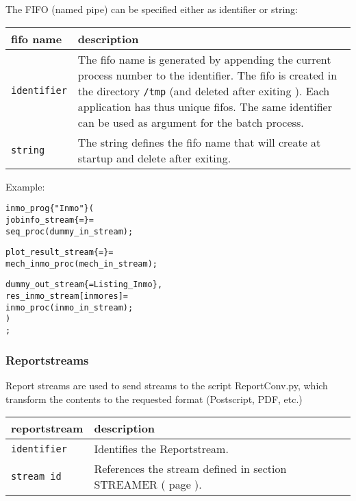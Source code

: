 The FIFO (named pipe) can be specified either as identifier or string:\\[2ex]
\begin{tabularx}{\textwidth}{l|X}
fifo name         & description \\
\hline
\verb+identifier+ & The fifo name is generated by appending the current process number
                    to the identifier. The fifo is created in the directory \verb+/tmp+
                    (and deleted after exiting \INTENS{}). Each \INTENS{} application has thus
                    unique fifos. The same identifier can be used as argument for the batch process.\\
\verb+string+     & The string defines the fifo name that \INTENS{} will create at startup
                    and delete after exiting.\\
\end{tabularx}
\vspace{0.5cm}

Example:

\begin{boxedminipage}[t]{\linewidth}
\begin{alltt}
  \PROCESSGROUP
     inmo_prog \{"Inmo"\} (
        jobinfo_stream \{\DISPLAY=\NONE\} =
           seq_proc( dummy_in_stream );

        plot_result_stream \{\DISPLAY=\NONE\} =
           mech_inmo_proc( mech_in_stream );

        dummy_out_stream \{\DISPLAY=Listing_Inmo\},
        res_inmo_stream[inmores] =
           inmo_proc( inmo_in_stream );
     )
 ;
\end{alltt}
\end{boxedminipage}


\subsubsection{Reportstreams}
\label{sec:reportstreams}
Report streams are used to send streams to the script ReportConv.py, which
transform the contents to the requested format (Postscript, PDF, etc.)
\label{sec:opreportstreams}


\begin{tabularx}{\textwidth}{l|X}
reportstream      & description \\
\hline
\verb+identifier+ & Identifies the Reportstream. \\
\verb+stream id+  & References the stream defined in section STREAMER
                                      (\nameref{sec:streamer} page \pageref{sec:streamer}). \\
\end{tabularx}

